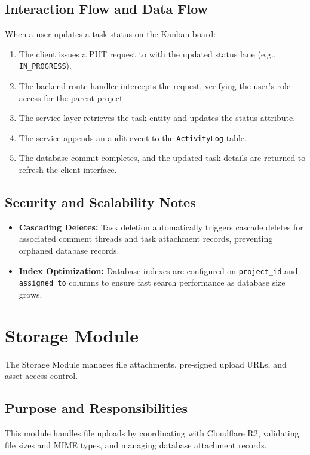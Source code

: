 \subsection{Interaction Flow and Data Flow}
When a user updates a task status on the Kanban board:
\begin{enumerate}
    \item The client issues a PUT request to  with the updated status lane (e.g., \texttt{IN\_PROGRESS}).
    \item The backend route handler intercepts the request, verifying the user's role access for the parent project.
    \item The service layer retrieves the task entity and updates the status attribute.
    \item The service appends an audit event to the \texttt{ActivityLog} table.
    \item The database commit completes, and the updated task details are returned to refresh the client interface.
\end{enumerate}

\subsection{Security and Scalability Notes}
\begin{itemize}
    \item \textbf{Cascading Deletes:} Task deletion automatically triggers cascade deletes for associated comment threads and task attachment records, preventing orphaned database records.
    \item \textbf{Index Optimization:} Database indexes are configured on \texttt{project\_id} and \texttt{assigned\_to} columns to ensure fast search performance as database size grows.
\end{itemize}

\section{Storage Module}
The Storage Module manages file attachments, pre-signed upload URLs, and asset access control.

\subsection{Purpose and Responsibilities}
This module handles file uploads by coordinating with Cloudflare R2, validating file sizes and MIME types, and managing database attachment records.

